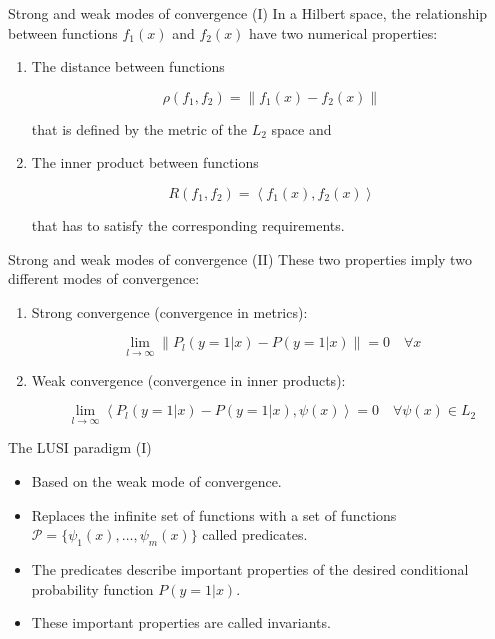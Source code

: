 \documentclass[10pt, dvipsnames]{beamer}
\newcommand{\norm}[1]{\lVert #1 \rVert}
\newcommand{\innerprod}[1]{\left< #1 \right>}
\newcommand{\set}[1]{\lbrace #1 \rbrace}
\begin{document}
\begin{frame}{Strong and weak modes of convergence (I)}
     In a Hilbert space, the relationship between functions $f_1(x)$ and $f_2(x)$ have two
    numerical properties:
    
        \begin{enumerate}
        \item<2-> The distance between functions
        
        \[
            \rho (f_1, f_2) = \norm{f_1(x) - f_2(x)}
        \]
        
        that is defined by the metric of the $L_2$ space and
        
        \item<3-> The inner product between functions
        
        \[
            R(f_1, f_2) = \innerprod{f_1(x), f_2(x)}
        \]
        
        that has to satisfy the corresponding requirements.
    \end{enumerate}
\end{frame}

\begin{frame}{Strong and weak modes of convergence (II)}
     These two properties imply two different modes of convergence:
    
    \begin{enumerate}
        \item<2-> Strong convergence (convergence in metrics):
        
        \[
    \lim_{l \to \infty} \norm{P_l(y=1 | x) - P(y=1 | x)} = 0\quad \forall x
\]
        
        \item<3-> Weak convergence (convergence in inner products):
        
        \[
    \lim_{l \to \infty} \innerprod{P_l(y=1 | x) - P(y=1 | x), \psi(x)} = 0\quad \forall \psi(x) \in L_2
\]
    \end{enumerate}
\end{frame}

\begin{frame}{The LUSI paradigm (I)}
    \begin{itemize}
        \item<1-> Based on the \alert{weak} mode of convergence.
        \item<2-> Replaces the infinite set of functions with a set of functions
        $\mathcal{P} = \set{\psi_1(x), \dots, \psi_m(x)}$ called predicates.
        \item<3-> The predicates describe important properties of the desired conditional
        probability function $P(y=1 | x)$.
        \item<4-> These important properties are called \alert{invariants}.
    \end{itemize}
\end{frame}
\end{document}

